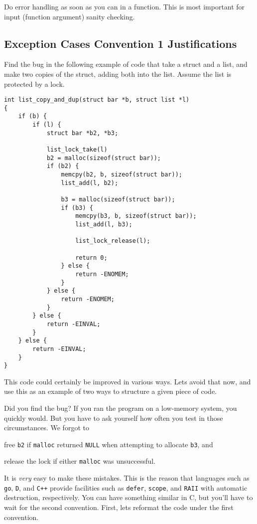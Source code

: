 \documentclass[11pt,onecolumn]{article}
\newcommand{\head}[1]{\vspace{0.4em}\noindent{\bf #1}}
\begin{document}
\head{Convention 3.} Do error handling as soon as you can in a
function.  This is most important for input (function argument) sanity
checking.

\subsection{Exception Cases Convention 1 Justifications}

Find the bug in the following example of code that take a struct and a
list, and make two copies of the struct, adding both into the list.
Assume the list is protected by a lock.  

    \begin{minipage}{3in}
      \footnotesize
      \lstset{language=C}
      \begin{lstlisting}
int list_copy_and_dup(struct bar *b, struct list *l) 
{
    if (b) {
        if (l) {
            struct bar *b2, *b3;

            list_lock_take(l)
            b2 = malloc(sizeof(struct bar));
            if (b2) {
                memcpy(b2, b, sizeof(struct bar));
                list_add(l, b2);

                b3 = malloc(sizeof(struct bar));
                if (b3) {
                    memcpy(b3, b, sizeof(struct bar));
                    list_add(l, b3);

                    list_lock_release(l);

                    return 0;
                } else {
                    return -ENOMEM;
                }
            } else {
                return -ENOMEM;
            }
        } else {
            return -EINVAL;
        }
    } else {
        return -EINVAL;
    }
}        
      \end{lstlisting}
    \end{minipage}

This code could certainly be improved in various ways.  Lets avoid
that now, and use this as an example of two ways to structure a given
piece of code.

Did you find the bug?  If you ran the program on a low-memory system,
you quickly would.  But you have to ask yourself how often you test in
those circumstances.  We forgot to 
\begin{inparaenum}[(i)]
\item free {\tt b2} if {\tt malloc} returned {\tt NULL} when attempting
to allocate {\tt b3}, and 
\item release the lock if either {\tt malloc} was unsuccessful.
\end{inparaenum}
It is {\em very} easy to make these mistakes.  This is the reason that
languages such as {\tt go}, {\tt D}, and {\tt C++} provide facilities
such as {\tt defer}, {\tt scope}, and {\tt RAII} with automatic
destruction, respectively.  You can have something similar in C, but
you'll have to wait for the second convention.  First, lets reformat
the code under the first convention.  
\end{document}
